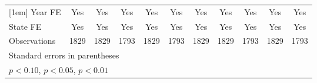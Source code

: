 {\begin{longtable}{l*{10}{c}}
[1em]
Year FE             &         Yes         &         Yes         &         Yes         &         Yes         &         Yes         &         Yes         &         Yes         &         Yes         &         Yes         &         Yes         \\
[1em]
State FE            &         Yes         &         Yes         &         Yes         &         Yes         &         Yes         &         Yes         &         Yes         &         Yes         &         Yes         &         Yes         \\
\hline
Observations        &        1829         &        1829         &        1793         &        1829         &        1793         &        1829         &        1829         &        1793         &        1829         &        1793         \\
\hline\hline
\multicolumn{11}{l}{\footnotesize Standard errors in parentheses}\\
\multicolumn{11}{l}{\footnotesize \sym{*} \(p<0.10\), \sym{**} \(p<0.05\), \sym{***} \(p<0.01\)}\\
\end{longtable}
}
